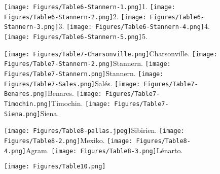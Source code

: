 \documentclass[a4paper, 11pt, oneside, german]{article}
\begin{document}
\clearpage
{}
\cfoot{\thepage}
\begin{figure}[p]
\texttt{[image: Figures/Table6-Stannern-1.png]}\tiny 1.
\texttt{[image: Figures/Table6-Stannern-2.png]}\tiny 2.
\texttt{[image: Figures/Table6-Stannern-3.png]}\tiny 3.
\texttt{[image: Figures/Table6-Stannern-4.png]}\tiny 4.
\texttt{[image: Figures/Table6-Stannern-5.png]}\tiny 5.
\end{figure}
\clearpage
{}
\cfoot{\thepage}
\begin{figure}[p]
\texttt{[image: Figures/Table7-Charsonville.png]}\tiny Charsonville.
\texttt{[image: Figures/Table7-Stannern-2.png]}\tiny Stannern.
\texttt{[image: Figures/Table7-Stannern.png]}\tiny Stannern.
\texttt{[image: Figures/Table7-Sales.png]}\tiny Salés.
\texttt{[image: Figures/Table7-Benares.png]}\tiny Benares.
\texttt{[image: Figures/Table7-Timochin.png]}\tiny Timochin.
\texttt{[image: Figures/Table7-Siena.png]}\tiny Siena.
\end{figure}
\clearpage
{}
\cfoot{\thepage}
\begin{figure}[p]
\texttt{[image: Figures/Table8-pallas.jpeg]}\tiny Sibirien.
\texttt{[image: Figures/Table8-2.png]}\tiny Mexiko.
\texttt{[image: Figures/Table8-4.png]}\tiny Agram.
\texttt{[image: Figures/Table8-3.png]}\tiny Lénarto.
\end{figure}
\clearpage
{}
\cfoot{\thepage}
\begin{figure}[p]
\texttt{[image: Figures/Table10.png]}
\end{figure}
\clearpage
\end{document}
